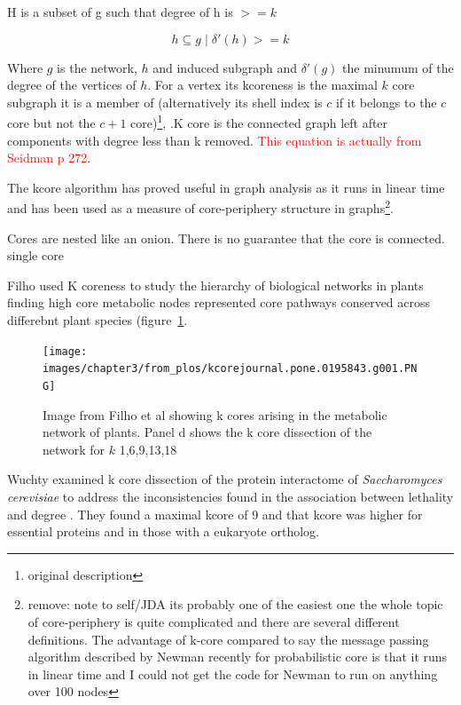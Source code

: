 H is a subset of g such that degree of h is $>=k$

\begin{equation}
h \subseteq g \mid \delta'(h)>=k
\end{equation}

Where $g$ is the network, $h$ and induced subgraph and  $\delta'(g)$ the minumum of the degree of the vertices of $h$.
For a vertex its kcoreness is the maximal $k$ core subgraph it is a member of (alternatively its shell index is $c$ if it belongs to the $c$ core but not the $c+1$ core)\cite{seidman1983network}\footnote{original description}, \cite{alvarez2006large}.K core is the connected graph left after components with degree less than k removed.  \textcolor{red}{This equation is actually from Seidman p 272}\cite{seidman1983network}.

The kcore algorithm has proved useful in graph analysis as it runs in linear time and has been used as a measure of core-periphery structure in graphs\cite{newman2018networks}\footnote{remove: note to self/JDA its probably one of the easiest one the whole topic of core-periphery is quite complicated and there are several different definitions. The advantage of k-core compared to say the message passing algorithm described by Newman recently for probabilistic core is that it runs in linear time and I could not get the code for Newman to run on anything over 100 nodes}.

Cores are nested like an onion. There is no guarantee that the core is connected. single core

Filho used K coreness to study the hierarchy of biological networks in plants finding high core metabolic nodes represented core pathways conserved across differebnt plant species\cite{filho2018hierarchical} (figure~\ref{fig:kcore from Filho}. 

\begin{figure}
    \centering
    \texttt{[image: images/chapter3/from\_plos/kcorejournal.pone.0195843.g001.PNG]}
    \caption{Image from Filho et al \cite{filho2018hierarchical} showing k cores arising in the metabolic network of plants. Panel d shows the k core dissection of the network for $k$ {1,6,9,13,18}}
    \label{fig:kcore from Filho}
\end{figure}

Wuchty examined k core dissection of the protein interactome of \textit{Saccharomyces cerevisiae} to address the inconsistencies found in the association between lethality and degree . They found a maximal kcore of 9 and that kcore was higher for essential proteins and in those with a eukaryote ortholog\cite{wuchty2005peeling}.

